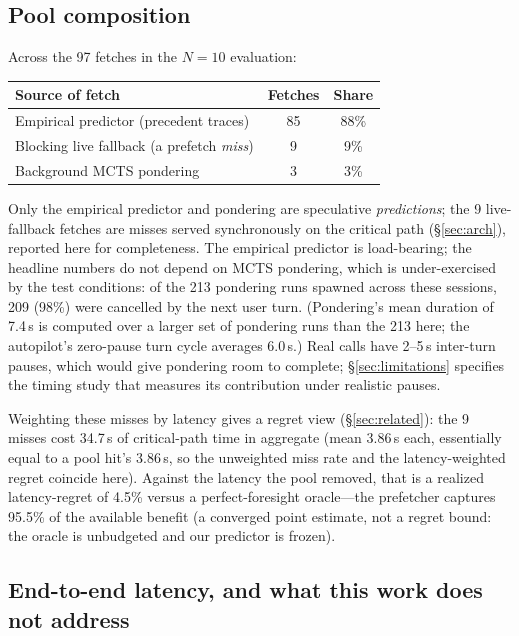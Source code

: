 \documentclass[10pt,twocolumn]{article}
\begin{document}
\subsection{Pool composition}

Across the 97 fetches in the $N{=}10$ evaluation:

\begin{center}\small
\begin{tabular}{lcc}
\toprule
Source of fetch & Fetches & Share \\
\midrule
Empirical predictor (precedent traces) & 85 & 88\% \\
Blocking live fallback (a prefetch \emph{miss}) & 9 & 9\% \\
Background MCTS pondering & 3 & 3\% \\
\bottomrule
\end{tabular}
\end{center}

Only the empirical predictor and pondering are speculative \emph{predictions}; the 9 live-fallback fetches are misses served synchronously on the critical path (\S\ref{sec:arch}), reported here for completeness. The empirical predictor is load-bearing; the headline numbers do not depend on MCTS pondering, which is under-exercised by the test conditions: of the 213 pondering runs spawned across these sessions, 209 (98\%) were cancelled by the next user turn. (Pondering's mean duration of 7.4\,s is computed over a larger set of pondering runs than the 213 here; the autopilot's zero-pause turn cycle averages 6.0\,s.) Real calls have 2--5\,s inter-turn pauses, which would give pondering room to complete; \S\ref{sec:limitations} specifies the timing study that measures its contribution under realistic pauses.

Weighting these misses by latency gives a regret view (\S\ref{sec:related}): the 9 misses cost 34.7\,s of critical-path time in aggregate (mean 3.86\,s each, essentially equal to a pool hit's 3.86\,s, so the unweighted miss rate and the latency-weighted regret coincide here). Against the latency the pool removed, that is a realized latency-regret of 4.5\% versus a perfect-foresight oracle---the prefetcher captures 95.5\% of the available benefit (a converged point estimate, not a regret bound: the oracle is unbudgeted and our predictor is frozen).

\subsection{End-to-end latency, and what this work does not address}
\label{sec:e2e}
\end{document}
